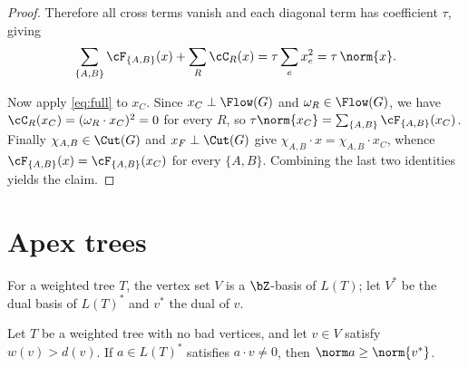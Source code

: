 \begin{proof}
Therefore all cross terms vanish and each diagonal term has coefficient $\tau$, giving
\begin{equation}
\label{eq:full}
\sum_{\{A,B\}}\cF_{\{A,B\}}(x)+\sum_{R}\cC_R(x)=\tau\sum_e x_e^2=\tau\,\norm{x}.
\end{equation}

Now apply \eqref{eq:full} to $x_C$.  Since $x_C\perp\Flow(G)$ and $\omega_R\in\Flow(G)$, we
have $\cC_R(x_C)=(\omega_R\cdot x_C)^2=0$ for every $R$, so
$\tau\norm{x_C}=\sum_{\{A,B\}}\cF_{\{A,B\}}(x_C)$.  Finally $\chi_{A,B}\in\Cut(G)$ and
$x_F\perp\Cut(G)$ give $\chi_{A,B}\cdot x=\chi_{A,B}\cdot x_C$, whence
$\cF_{\{A,B\}}(x)=\cF_{\{A,B\}}(x_C)$ for every $\{A,B\}$.  Combining the last two
identities yields the claim.
\end{proof}

\section{Apex trees}
\label{sec:apex}

For a weighted tree $T$, the vertex set $V$ is a $\bZ$-basis of $L(T)$; let $V^\ast$ be the
dual basis of $L(T)^\ast$ and $v^\ast$ the dual of $v$.

\begin{lem}
\label{lem:apex}
Let $T$ be a weighted tree with no bad vertices, and let $v\in V$ satisfy $w(v)>d(v)$.  If
$a\in L(T)^\ast$ satisfies $a\cdot v\ne 0$, then $\norm a\ge\norm{v^\ast}$.
\end{lem}

